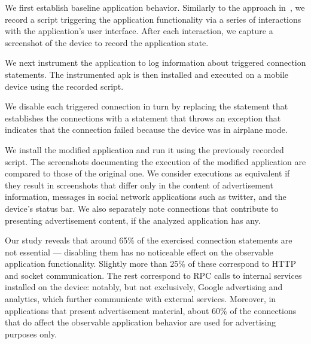  We first establish baseline
application behavior.  Similarly to the approach
in~\cite{Hornyack:Han:Jung:Schechter:Wetherall:CCS11}, we record a
script triggering the application functionality via a series of
interactions with the application's user interface.  After each
interaction, we capture a screenshot of the device to record the
application state.

 We next instrument the application to log information
about triggered connection statements. The instrumented apk is then
installed and executed on a mobile device using the recorded script.

 We disable each triggered connection
in turn by replacing the statement that establishes the connections 
with a statement that throws an exception that indicates that the
connection failed because the device was in airplane mode. 

 We install the modified
application and run it using the previously recorded script. The
screenshots documenting the execution of the modified application are
compared to those of the original one. We consider executions as
equivalent if they result in screenshots that differ only in the
content of advertisement information, messages in social network
applications such as twitter, and the device's status bar.  We also
separately note connections that contribute to presenting
advertisement content, if the analyzed application has any.

 Our study reveals that around 65\% of
the exercised connection statements are not essential --- disabling
them has no noticeable effect on the observable application
functionality.  Slightly more than 25\% of these correspond to HTTP
and socket communication. The rest correspond to RPC calls to internal
services installed on the device: notably, but not exclusively, Google
advertising and analytics, which further communicate with external
services.  Moreover, in applications that present advertisement
material, about 60\% of the connections that do affect the observable
application behavior are used for advertising purposes only.

